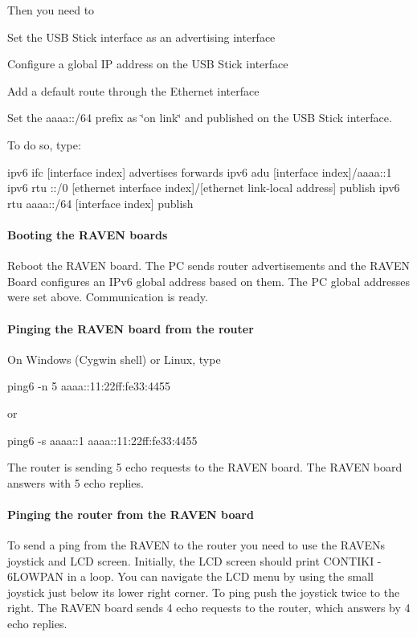 Then you need to \begin{DoxyItemize}
\item Set the U\+SB Stick interface as an advertising interface \item Configure a global IP address on the U\+SB Stick interface \item Add a default route through the Ethernet interface \item Set the aaaa\+:\+:/64 prefix as \char`\"{}on link\char`\"{} and published on the U\+SB Stick interface.\end{DoxyItemize}
To do so, type\+: 
\begin{DoxyCode}
ipv6 ifc [\textcolor{keyword}{interface }index] advertises forwards
ipv6 adu [interface index]/aaaa::1
ipv6 rtu ::/0 [ethernet interface index]/[ethernet link-local address] publish
ipv6 rtu aaaa::/64 [interface index] publish
\end{DoxyCode}
\hypertarget{a00072_running_raven}{}\paragraph{Booting the R\+A\+V\+E\+N boards}\label{a00072_running_raven}
Reboot the R\+A\+V\+EN board. The PC sends router advertisements and the R\+A\+V\+EN Board configures an I\+Pv6 global address based on them. The PC global addresses were set above. Communication is ready.\hypertarget{a00072_running_ping1}{}\paragraph{Pinging the R\+A\+V\+E\+N board from the router}\label{a00072_running_ping1}
On Windows (Cygwin shell) or Linux, type \begin{DoxyVerb}ping6 -n 5 aaaa::11:22ff:fe33:4455
\end{DoxyVerb}
 or \begin{DoxyVerb}ping6 -s aaaa::1 aaaa::11:22ff:fe33:4455
\end{DoxyVerb}
 The router is sending 5 echo requests to the R\+A\+V\+EN board. The R\+A\+V\+EN board answers with 5 echo replies.\hypertarget{a00072_running_ping2}{}\paragraph{Pinging the router from the R\+A\+V\+E\+N board}\label{a00072_running_ping2}
To send a ping from the R\+A\+V\+EN to the router you need to use the R\+A\+V\+EN\textquotesingle{}s joystick and L\+CD screen. Initially, the L\+CD screen should print C\+O\+N\+T\+I\+KI -\/ 6\+L\+O\+W\+P\+AN in a loop. You can navigate the L\+CD menu by using the small joystick just below its lower right corner. To \textquotesingle{}ping\textquotesingle{} push the joystick twice to the right. The R\+A\+V\+EN board sends 4 echo requests to the router, which answers by 4 echo replies.~\newline
